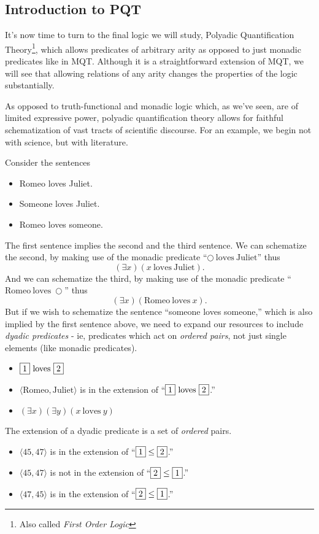 \subsection{Introduction to PQT}
It's now time to turn to the final logic we will study, Polyadic Quantification Theory\footnote{Also called \emph{First Order Logic}}, which allows predicates of arbitrary arity as opposed to just monadic predicates like in MQT. Although it is a straightforward extension of MQT, we will see that allowing relations of any arity changes the properties of the logic substantially. 

As opposed to truth-functional and monadic logic which, as we've seen, are of limited expressive power, polyadic quantification theory allows for faithful schematization of vast tracts of scientific discourse. For an example, we begin not with science, but with literature.

Consider the sentences
\begin{itemize}
\item
Romeo loves Juliet.
\item
Someone loves Juliet.
\item
Romeo loves someone.
\end{itemize}
The first sentence implies the second and the third sentence.
We can schematize the second, by making use of the monadic predicate ``$\bigcirc\ \mathrm{loves\ Juliet}$'' thus
\[(\exists x)(x\ \mathrm{loves\ Juliet}).\]
And we can schematize the third, by making use of the monadic predicate ``$\mathrm{Romeo\ loves}\ \bigcirc$'' thus
\[(\exists x)(\mathrm{Romeo\ loves}\ x).\]
But if we wish to schematize the sentence ``someone loves someone,'' which is also implied by the first sentence above, we need to expand our resources to include \emph{dyadic predicates} - ie, predicates which act on \emph{ordered pairs}, not just single elements (like monadic predicates).
\begin{itemize}
\item
$\fbox{1}\ \mathrm{loves}\ \fbox{2}$
\item
$\langle \mathrm{Romeo,Juliet} \rangle$ is in the extension of 
``$\fbox{1}\ \mathrm{loves}\ \fbox{2}$.''
\item
$(\exists x)(\exists y)(x\ \mathrm{loves}\ y)$
\end{itemize}

The extension of a dyadic predicate is a set of \emph{ordered} pairs.
\begin{itemize}
\item
$\langle 45,47 \rangle$ is in the extension of ``$\fbox{1} \leq \fbox{2}$.''
\item
$\langle 45,47 \rangle$ is not in the extension of ``$\fbox{2} \leq \fbox{1}$.''
\item
$\langle 47,45 \rangle$ is in the extension of ``$\fbox{2} \leq \fbox{1}$.''
\end{itemize}

